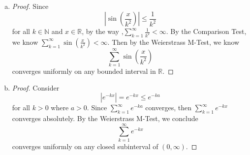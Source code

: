 \begin{Exercise}
\begin{enumerate}[a)]
\item
\begin{proof}
Since $$\left| \sin\left(\frac{x}{k^2}\right) \right| \leq \frac{1}{k^2}$$
for all $k\in\mathbb{N}$ and $x\in\mathbb{R}$, by the way ,$\sum_{k=1}^{\infty}\frac{1}{k^2} < \infty$. By the Comparison Test, we know $\sum_{k=1}^{\infty} \sin\left(\frac{x}{k^2}\right) < \infty$. Then by the Weierstrass M-Test, we know $$\sum_{k=1}^{\infty}\sin\left(\frac{x}{k^2}\right)$$ converges uniformly on any bounded interval in $\mathbb{R}$.
\end{proof}

\item 
\begin{proof}
Consider $$\left| e^{-kx} \right| = e^{-kx} \leq e^{-ka}$$ for all $k>0$ where $a > 0$.
Since $\sum_{k=1}^{\infty} e^{-ka}$ converges, then $\sum_{k=1}^{\infty} e^{-kx}$ converges absolutely. By the Weierstrass M-Test, we conclude $$\sum_{k=1}^{\infty} e^{-kx}$$ converges uniformly on any closed subinterval of $(0,\infty)$.
\end{proof}
\end{enumerate}
\end{Exercise}
